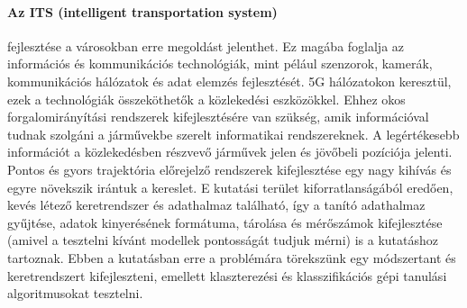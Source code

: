 \documentclass[acmtog, authorversion]{acmart}
\begin{document}
\paragraph{Az ITS (intelligent transportation system)} fejlesztése a városokban erre megoldást jelenthet. Ez magába foglalja az információs és
kommunikációs technológiák, mint pélául szenzorok, kamerák, kommunikációs hálózatok és adat elemzés fejlesztését. 5G hálózatokon
keresztül, ezek a technológiák összeköthetők a közlekedési eszközökkel. Ehhez okos forgalomirányítási rendszerek kifejlesztésére
van szükség, amik információval tudnak szolgáni a járművekbe szerelt informatikai rendszereknek.
A legértékesebb információt a közlekedésben részvevő járművek jelen és jövőbeli pozíciója jelenti. Pontos és gyors trajektória 
előrejelző rendszerek kifejlesztése egy nagy kihívás és egyre növekszik irántuk a kereslet. E kutatási terület kiforratlanságából
eredően, kevés létező keretrendszer és adathalmaz található, így a tanító adathalmaz gyűjtése, adatok kinyerésének formátuma, tárolása
és mérőszámok kifejlesztése (amivel a tesztelni kívánt modellek pontosságát tudjuk mérni) is a kutatáshoz tartoznak.  
Ebben a kutatásban erre a problémára törekszünk egy módszertant és keretrendszert kifejleszteni, emellett klaszterezési és klasszifikációs
gépi tanulási algoritmusokat tesztelni.
\end{document}

